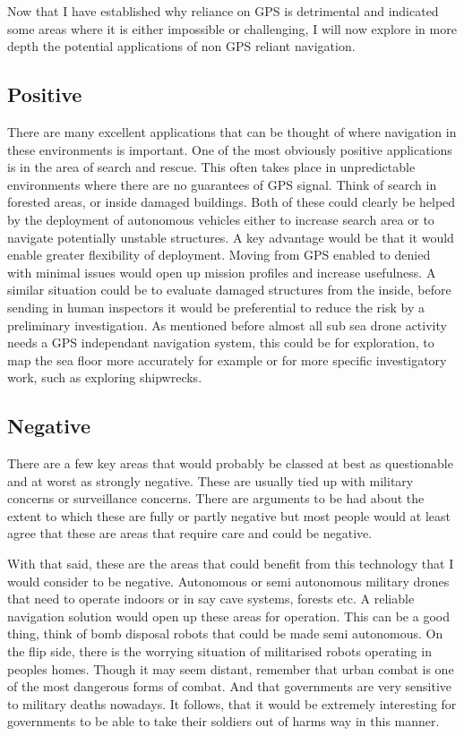 \documentclass[]{article}
\begin{document}
Now that I have established why reliance on GPS is detrimental and indicated some areas where it is either impossible or challenging, I will now explore in more depth the potential applications of non GPS reliant navigation.

\subsection{Positive}

There are many excellent applications that can be thought of where navigation in these environments is important.
One of the most obviously positive applications is in the area of search and rescue. This often takes place in unpredictable environments where there are no guarantees of GPS signal. Think of search in forested areas, or inside damaged buildings.
Both of these could clearly be helped by the deployment of autonomous vehicles either to increase search area or to navigate potentially unstable structures.
A key advantage would be that it would enable greater flexibility of deployment. Moving from GPS enabled to denied with minimal issues would open up mission profiles and increase usefulness.
A similar situation could be to evaluate damaged structures from the inside, before sending in human inspectors it would be preferential to reduce the risk by a preliminary investigation.
As mentioned before almost all sub sea drone activity needs a GPS independant navigation system, this could be for exploration, to map the sea floor more accurately for example or for more specific investigatory work, such as exploring shipwrecks.



\subsection{Negative}

There are a few key areas that would probably be classed at best as questionable and at worst as strongly negative. 
These are usually tied up with military concerns or surveillance concerns. There are arguments to be had about the extent to which these are fully or partly negative but 
most people would at least agree that these are areas that require care and could be negative.

With that said, these are the areas that could benefit from this technology that I would consider to be negative.
Autonomous or semi autonomous military drones that need to operate indoors or in say cave systems, forests etc. 
A reliable navigation solution would open up these areas for operation. This can be a good thing, think of bomb disposal robots that could be made semi autonomous.
On the flip side, there is the worrying situation of militarised robots operating in peoples homes. Though it may seem distant, remember that urban combat is one of the most dangerous forms of combat. 
And that governments are very sensitive to military deaths nowadays. It follows, that it would be extremely interesting for governments to be able to take their soldiers out of harms way in this manner.
\end{document}
